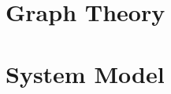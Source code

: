 \documentclass{article}
\begin{document}


\tableofcontents
\newpage



\newpage

\section{Graph Theory}\label{sec:GraphTheory}

\newpage


\newpage

\section{System Model}\label{sec:SysModel}

\newpage







\printbibliography
\end{document}
